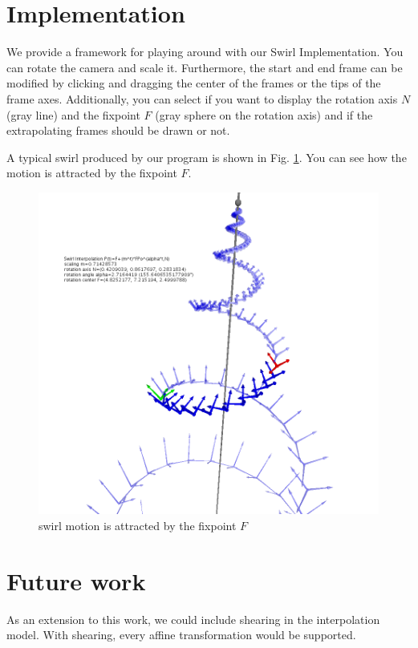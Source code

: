 \documentclass[journal, letterpaper]{IEEEtran}
\begin{document}
\section{Implementation}
We provide a framework for playing around with our Swirl Implementation. You can rotate the camera and scale it. Furthermore, the start and end frame can be modified by clicking and dragging the center of the frames or the tips of the frame axes. Additionally, you can select if you want to display the rotation axis $N$ (gray line) and the fixpoint $F$ (gray sphere on the rotation axis) and if the extrapolating frames should be drawn or not. 

A typical swirl produced by our program is shown in Fig. \ref{fig:P3}. You can see how the motion is attracted by the fixpoint $F$.

\begin{figure}
	\centering
		\includegraphics[scale=0.3]{pictures/P3.png}
	\caption{swirl motion is attracted by the fixpoint $F$}
	\label{fig:P3}
\end{figure}

\section{Future work}
As an extension to this work, we could include shearing in the interpolation model. With shearing, every affine transformation would be supported.
\end{document}
